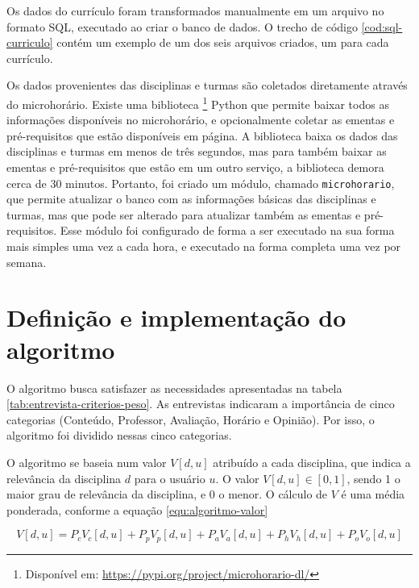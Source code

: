 Os dados do currículo foram transformados manualmente em um arquivo no formato SQL, executado ao criar o banco de dados. O trecho de código \ref{cod:sql-curriculo} contém um exemplo de um dos seis arquivos criados, um para cada currículo.



Os dados provenientes das disciplinas e turmas são coletados diretamente através do microhorário. Existe uma biblioteca  
\footnote{Dispon\'ivel em: \url{https://pypi.org/project/microhorario-dl/}}
Python que permite baixar todos as informações disponíveis no microhorário, e opcionalmente coletar as ementas e pré-requisitos que estão disponíveis em página. A biblioteca baixa os dados das disciplinas e turmas em menos de três segundos, mas para também baixar as ementas e pré-requisitos que estão em um outro serviço, a biblioteca demora cerca de 30 minutos. Portanto, foi criado um módulo, chamado \verb|microhorario|, que permite atualizar o banco com as informações básicas das disciplinas e turmas, mas que pode ser alterado para atualizar também as ementas e pré-requisitos. Esse módulo foi configurado de forma a ser executado na sua forma mais simples uma vez a cada hora, e executado na forma completa uma vez por semana.

\section{Definição e implementação do algoritmo}

O algoritmo busca satisfazer as necessidades apresentadas na tabela \ref{tab:entrevista-criterios-peso}. As entrevistas indicaram a importância de cinco categorias (Conteúdo, Professor, Avaliação, Horário e Opinião). Por isso, o algoritmo foi dividido nessas cinco categorias.

O algoritmo se baseia num valor $V[d,u]$ atribuído a cada disciplina, que indica a relevância da disciplina $d$ para o usuário $u$. O valor $V[d,u] \in [0, 1]$,
sendo 1 o maior grau de relevância da disciplina, e 0 o menor. O cálculo de $V$ é uma média ponderada, conforme a equação \ref{equ:algoritmo-valor}

\begin{equation}
\label{equ:algoritmo-valor}
    V[d,u] = P_cV_c[d,u] + P_pV_p[d,u] + P_aV_a[d,u] + P_hV_h[d,u] + P_oV_o[d,u]
\end{equation}

